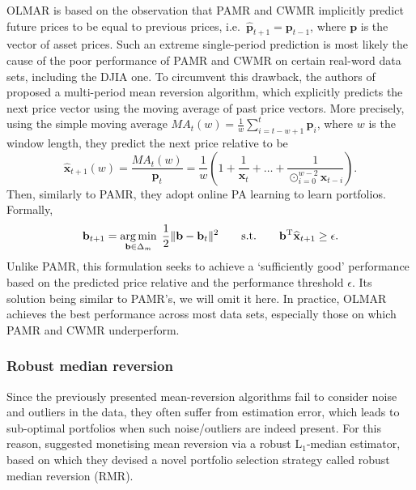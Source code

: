 OLMAR is based on the observation that PAMR and CWMR implicitly predict future prices to be equal to previous prices, i.e.\ $\widehat{\mathbf{p}}_{t+1} = \mathbf{p}_{t-1}$, where $\mathbf{p}$ is the vector of asset prices. Such an extreme single-period prediction is most likely the cause of the poor performance of PAMR and CWMR on certain real-word data sets, including the DJIA one. To circumvent this drawback, the authors of \citep{olmar} proposed a multi-period mean reversion algorithm, which explicitly predicts the next price vector using the moving average of past price vectors. More precisely, using the simple moving average $MA_t(w) = \frac{1}{w}\sum_{i=t-w+1}^t \mathbf{p}_i$, where $w$ is the window length, they predict the next price relative to be
\begin{equation}
	\widehat{\mathbf{x}}_{t+1}(w) = \frac{MA_t(w)}{\mathbf{p}_t} = \frac{1}{w}\left(1 + \frac{1}{\mathbf{x}_t} + \ldots + \frac{1}{\odot_{i=0}^{w-2}\mathbf{x}_{t-i}}\right).
\end{equation}
Then, similarly to PAMR, they adopt online PA learning to learn portfolios. Formally,
\begin{equation}
	\mathbf{b}_{t+1}
	= \operatorname*{arg\,min}_{\mathbf{b}\in\Delta_m} \; \frac{1}{2}\Vert\mathbf{b}-\mathbf{b}_t\Vert^2
	\qquad \text{s.t.} \qquad \mathbf{b}^\text{T}\widehat{\mathbf{x}}_{t+1} \geq \epsilon.
\end{equation}
Unlike PAMR, this formulation seeks to achieve a `sufficiently good' performance based on the predicted price relative and the performance threshold $\epsilon$. Its solution being similar to PAMR's, we will omit it here. In practice, OLMAR achieves the best performance across most data sets, especially those on which PAMR and CWMR underperform.

\subsubsection{Robust median reversion}

Since the previously presented mean-reversion algorithms fail to consider noise and outliers in the data, they often suffer from estimation error, which leads to sub-optimal portfolios when such noise/outliers are indeed present. For this reason, \citet{rmr} suggested monetising mean reversion via a robust $\mathrm{L}_1$-median estimator, based on which they devised a novel portfolio selection strategy called robust median reversion (RMR).

